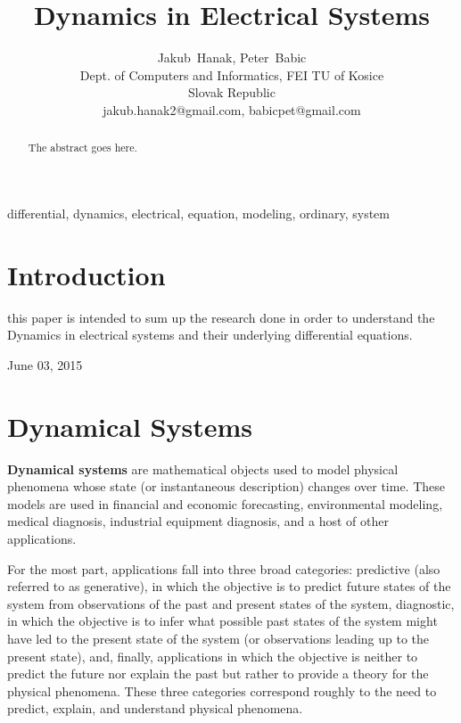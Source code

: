 \documentclass[journal]{IEEEtran}
\begin{document}
\boldmath

\title{Dynamics in Electrical Systems}

\author{Jakub~Hanak,
        Peter~Babic\\%
        Dept. of Computers and Informatics, FEI TU of Kosice\\%
        Slovak Republic\\%
        jakub.hanak2@gmail.com, babicpet@gmail.com%
}

%
{}


\maketitle


\begin{abstract}
The abstract goes here.
\end{abstract}

\begin{IEEEkeywords}
differential, dynamics, electrical, equation, modeling, ordinary, system
\end{IEEEkeywords}



\IEEEpeerreviewmaketitle



\section{Introduction}

 this paper is intended to sum up the research done in order to understand the Dynamics in electrical systems and their underlying differential equations.

 
\hfill June 03, 2015

\section{Dynamical Systems}
\textbf{Dynamical systems} are mathematical objects used to model physical phenomena whose state (or instantaneous description) changes over time. These models are used in financial and economic forecasting, environmental modeling, medical diagnosis, industrial equipment diagnosis, and a host of other applications.

For the most part, applications fall into three broad categories: predictive (also referred to as generative), in which the objective is to predict future states of the system from observations of the past and present states of the system, diagnostic, in which the objective is to infer what possible past states of the system might have led to the present state of the system (or observations leading up to the present state), and, finally, applications in which the objective is neither to predict the future nor explain the past but rather to provide a theory for the physical phenomena. These three categories correspond roughly to the need to predict, explain, and understand physical phenomena.
\end{document}
